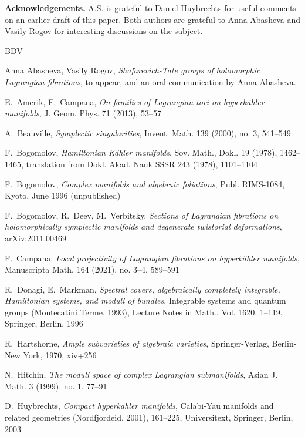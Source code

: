 \documentclass[10pt]{amsart}
\begin{document}
\medskip

{\bf Acknowledgements.} A.S. is grateful to Daniel Huybrechts for useful comments
on an earlier draft of this paper. Both authors are
grateful to Anna Abasheva and Vasily Rogov for
interesting discussions on the subject.

\begin{thebibliography}{BDV}

Anna Abasheva, Vasily Rogov, {\em  
Shafarevich-Tate groups of holomorphic Lagrangian fibrations}, to appear, and
an oral communication by Anna Abasheva.

E.\ Amerik, F.\ Campana, {\it On families of Lagrangian tori on hyperk\"ahler manifolds},
J. Geom. Phys. 71 (2013), 53--57

A.\ Beauville, {\it Symplectic singularities}, Invent. Math. 139 (2000), no. 3, 541--549

F.\ Bogomolov, {\it Hamiltonian K\"ahler manifolds},
Sov. Math., Dokl. 19 (1978), 1462--1465, 
translation from Dokl. Akad. Nauk SSSR 243 (1978), 1101--1104

F.\ Bogomolov, {\it Complex manifolds and algebraic foliations}, Publ. RIMS-1084, Kyoto, June 1996 (unpublished)

F.\ Bogomolov, R.\ Deev, M.\ Verbitsky, {\it Sections of Lagrangian fibrations on holomorphically symplectic
manifolds and degenerate twistorial deformations}, arXiv:2011.00469

F.\ Campana, {\it Local projectivity of Lagrangian fibrations on hyperk\"ahler manifolds},
Manuscripta Math. 164 (2021), no. 3--4, 589--591

R.\ Donagi, E.\ Markman, {\it Spectral covers, algebraically completely integrable,
Hamiltonian systems, and moduli of bundles}, Integrable systems and quantum groups (Montecatini Terme, 1993),
Lecture Notes in Math., Vol. 1620, 1--119, Springer, Berlin, 1996

R.\ Hartshorne, {\it Ample subvarieties of algebraic varieties},
Springer-Verlag, Berlin-New York, 1970, xiv+256

N.\ Hitchin, {\it The moduli space of complex Lagrangian submanifolds},
Asian J. Math. 3 (1999), no. 1, 77--91

D.\ Huybrechts, {\it Compact hyperk\"ahler manifolds},
Calabi-Yau manifolds and related geometries (Nordfjordeid, 2001), 161--225, Universitext, Springer, Berlin, 2003


\end{thebibliography}
\end{document}

